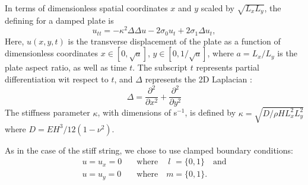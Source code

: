 \documentclass{article}
\begin{document}
In terms of dimensionless spatial coordinates $x$ and $y$ scaled by $\sqrt{L_{x}L_{y}}$, the defining for a damped plate is \cite{Bilbao2009:NumericalSoundSynthesis}
\begin{equation}\label{eq:platePDE}
    u_{tt} = -\kappa^2 \Delta\Delta u - 2 \sigma_0 u_{t} + 2\sigma_1 \Delta u_{t},
\end{equation}
Here, $u(x,y,t)$ is the transverse displacement of the plate as a function of dimensionless coordinates $x\in[0, \sqrt{a}]$, $y\in[0,1/\sqrt{a}]$, where $a = L_{x}/L_{y}$ is the plate aspect ratio, as well as time $t$. The subscript $t$ represents partial differentiation wit respect to $t$, and $\Delta$ represents the 2D Laplacian \cite{Bilbao2009:NumericalSoundSynthesis}:
\begin{equation}
    \Delta  = \frac{\partial^2}{\partial x^2}+\frac{\partial^2}{\partial y^2}
\end{equation}
The stiffness parameter $\kappa$, with dimensions of s$^{-1}$, is defined by $\kappa = \sqrt{D/\rho H L_{x}^2L_{y}^2}$ where $D = EH^3/12\left(1-\nu^2\right)$.

As in the case of the stiff string, we chose to use clamped boundary conditions:
\begin{equation}
    \begin{aligned}
        u = u_x = 0 \quad &\text{where} \quad \: l \, \, = \{0, 1\} \quad \text{and} \\
        u = u_y = 0 \quad &\text{where} \quad m = \{0, 1\}.
    \end{aligned}
\end{equation}

\end{document}
